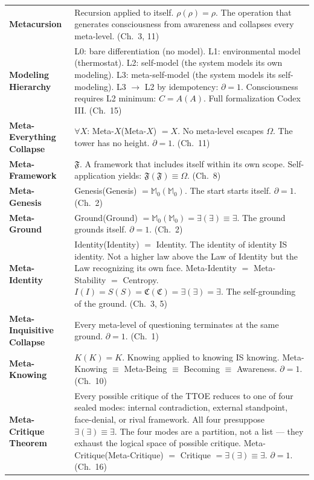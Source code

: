\documentclass[10pt, openany, oneside]{book}
\renewcommand{\footnotesize}{\fontsize{8.5}{11}\selectfont}
\begin{document}
{\footnotesize
\noindent\begin{tabular}{@{} l @{\hspace{0.6em}} p{} @{}}
\textbf{Metacursion} & Recursion applied to itself. $\rho(\rho) = \rho$. The operation that generates consciousness from awareness and collapses every meta-level. (Ch.\ 3, 11) \\[0.3em]
\textbf{Modeling Hierarchy} & L0: bare differentiation (no model). L1: environmental model (thermostat). L2: self-model (the system models its own modeling). L3: meta-self-model (the system models its self-modeling). L3 $\to$ L2 by idempotency: $\partial = 1$. Consciousness requires L2 minimum: $C = A(A)$. Full formalization Codex III. (Ch.\ 15) \\[0.3em]
\textbf{Meta-Everything Collapse} & $\forall X$: Meta-$X$(Meta-$X$) $= X$. No meta-level escapes $\Omega$. The tower has no height. $\partial = 1$. (Ch.\ 11) \\[0.3em]
\textbf{Meta-Framework} & $\mathfrak{F}$. A framework that includes itself within its own scope. Self-application yields: $\mathfrak{F}(\mathfrak{F}) \equiv \Omega$. (Ch.\ 8) \\[0.3em]
\textbf{Meta-Genesis} & Genesis(Genesis) $= \mathbb{M}_0(\mathbb{M}_0)$. The start starts itself. $\partial = 1$. (Ch.\ 2) \\[0.3em]
\textbf{Meta-Ground} & Ground(Ground) $= \mathbb{M}_0(\mathbb{M}_0) = \exists(\exists) \equiv \exists$. The ground grounds itself. $\partial = 1$. (Ch.\ 2) \\[0.3em]
\textbf{Meta-Identity} & Identity(Identity) $=$ Identity. The identity of identity IS identity. Not a higher law above the Law of Identity but the Law recognizing its own face. Meta-Identity $=$ Meta-Stability $=$ Centropy. $I(I) = S(S) = \mathfrak{C}(\mathfrak{C}) = \exists(\exists) = \exists$. The self-grounding of the ground. (Ch.\ 3, 5) \\[0.3em]
\textbf{Meta-Inquisitive Collapse} & Every meta-level of questioning terminates at the same ground. $\partial = 1$. (Ch.\ 1) \\[0.3em]
\textbf{Meta-Knowing} & $K(K) = K$. Knowing applied to knowing IS knowing. Meta-Knowing $\equiv$ Meta-Being $\equiv$ Becoming $\equiv$ Awareness. $\partial = 1$. (Ch.\ 10) \\[0.3em]
\textbf{Meta-Critique Theorem} & Every possible critique of the TTOE reduces to one of four sealed modes: internal contradiction, external standpoint, face-denial, or rival framework. All four presuppose $\exists(\exists) \equiv \exists$. The four modes are a partition, not a list --- they exhaust the logical space of possible critique. Meta-Critique(Meta-Critique) $=$ Critique $= \exists(\exists) \equiv \exists$. $\partial = 1$. (Ch.\ 16) \\[0.3em]

\end{tabular}}
\end{document}
